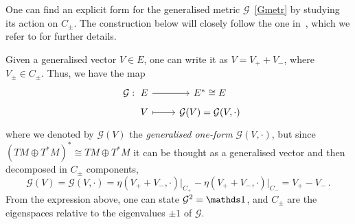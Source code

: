 \documentclass[debug]{phd}
\begin{document}
						One can find an explicit form for the generalised metric $\mathcal{G}$~\eqref{Gmetr} by studying its action on $C_{\pm}$.
						The construction below will closely follow the one in~\cite{baraglia}, which we refer to for further details.
						
						Given a generalised vector $V \in E$, one can write it as $ V= V_+ + V_{-}$, where $V_{\pm} \in C_{\pm}$.
						Thus, we have the map
								\begin{equation}
									\begin{tikzcd}[row sep=tiny]
										\mathcal{G} :\!\!\!\!\!\!\!\!\!\!\!\!\!\!\!\!\!\!\!\!& E \arrow{r} & E^* \cong E \\
 																	& V \arrow[mapsto]{r} & \mathcal{G}(V) = \mathcal{G}(V, \cdot)
									\end{tikzcd}
								\end{equation}
						where we denoted by $\mathcal{G}(V)$ the \emph{generalised one-form} $\mathcal{G}(V,\cdot)$, but since $(TM \oplus T^*M )^* \cong TM \oplus T^*M$ it can be thought as a generalised vector and then decomposed in $C_{\pm}$ components,
								\begin{equation}
									\mathcal{G}(V) = \mathcal{G}(V, \cdot) = \eta( V_{+} + V_{-}, \cdot )\big|_{C_{+}} - \eta( V_{+} + V_{-}, \cdot )\big|_{C_{-}} = V_{+} - V_{-} \, .
								\end{equation}
						From the expression above, one can state $\mathcal{G}^2 = \id$, and $C_\pm$ are the eigenspaces relative to the eigenvalues $\pm 1$ of $\mathcal{G}$.
						
\end{document}
